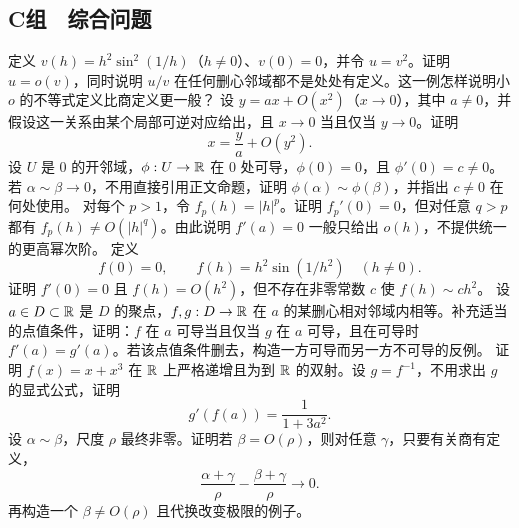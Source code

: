 \subsection*{C组　综合问题}
\begin{enumerate}[label=\textbf{\thechapter.\arabic*.},resume]
  定义 \(v(h)=h^2\sin^2(1/h)\)（\(h\ne0\)）、\(v(0)=0\)，并令 \(u=v^2\)。证明 \(u=o(v)\)，同时说明 \(u/v\) 在任何删心邻域都不是处处有定义。这一例怎样说明小 \(o\) 的不等式定义比商定义更一般？
  设 \(y=ax+O(x^2)\)（\(x\to0\)），其中 \(a\ne0\)，并假设这一关系由某个局部可逆对应给出，且 \(x\to0\) 当且仅当 \(y\to0\)。证明
 \[
  x=\frac ya+O(y^2).
 \]
  设 \(U\) 是 \(0\) 的开邻域，\(\phi:U\to\mathbb{R}\) 在 \(0\) 处可导，\(\phi(0)=0\)，且 \(\phi'(0)=c\ne0\)。若 \(\alpha\sim\beta\to0\)，不用直接引用正文命题，证明 \(\phi(\alpha)\sim\phi(\beta)\)，并指出 \(c\ne0\) 在何处使用。
  对每个 \(p>1\)，令 \(f_p(h)=|h|^p\)。证明 \(f_p'(0)=0\)，但对任意 \(q>p\) 都有 \(f_p(h)\ne O(|h|^q)\)。由此说明 \(f'(a)=0\) 一般只给出 \(o(h)\)，不提供统一的更高幂次阶。
  定义
 \[
  f(0)=0,\qquad f(h)=h^2\sin(1/h^2)\quad(h\ne0).
 \]
证明 \(f'(0)=0\) 且 \(f(h)=O(h^2)\)，但不存在非零常数 \(c\) 使 \(f(h)\sim c h^2\)。
  设 \(a\in D\subset\mathbb{R}\) 是 \(D\) 的聚点，\(f,g:D\to\mathbb{R}\) 在 \(a\) 的某删心相对邻域内相等。补充适当的点值条件，证明：\(f\) 在 \(a\) 可导当且仅当 \(g\) 在 \(a\) 可导，且在可导时 \(f'(a)=g'(a)\)。若该点值条件删去，构造一方可导而另一方不可导的反例。
  证明 \(f(x)=x+x^3\) 在 \(\mathbb{R}\) 上严格递增且为到 \(\mathbb{R}\) 的双射。设 \(g=f^{-1}\)，不用求出 \(g\) 的显式公式，证明
 \[
  g'(f(a))=\frac1{1+3a^2}.
 \]
  设 \(\alpha\sim\beta\)，尺度 \(\rho\) 最终非零。证明若 \(\beta=O(\rho)\)，则对任意 \(\gamma\)，只要有关商有定义，
 \[
  \frac{\alpha+\gamma}{\rho}
  -\frac{\beta+\gamma}{\rho}\longrightarrow0.
 \]
再构造一个 \(\beta\ne O(\rho)\) 且代换改变极限的例子。
\end{enumerate}
